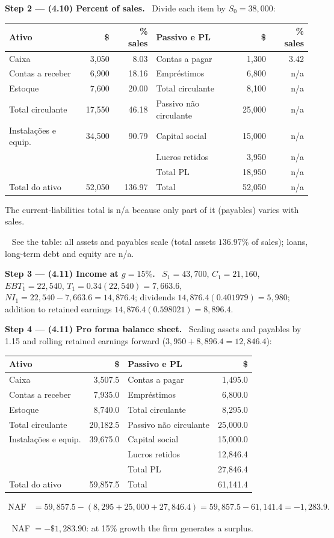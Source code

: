 \documentclass[11pt,a4paper]{article}
\newcommand{\step}[2]{\par\medskip\noindent\textbf{Step #1 --- #2.}~}
\newcommand{\answer}[1]{\par\smallskip\noindent\fbox{\textbf{Answer #1.}}~}
\begin{document}
\step{2}{(4.10) Percent of sales} Divide each item by $S_0=38{,}000$:
\begin{center}\small
\begin{tabular}{lrr@{\qquad}lrr}
\toprule
Ativo & \$ & \% sales & Passivo e PL & \$ & \% sales\\
\midrule
Caixa & 3,050 & 8.03 & Contas a pagar & 1,300 & 3.42\\
Contas a receber & 6,900 & 18.16 & Empr\'estimos & 6,800 & n/a\\
Estoque & 7,600 & 20.00 & Total circulante & 8,100 & n/a\\
Total circulante & 17,550 & 46.18 & Passivo n\~ao circulante & 25,000 & n/a\\
Instala\c{c}\~oes e equip. & 34,500 & 90.79 & Capital social & 15,000 & n/a\\
 & & & Lucros retidos & 3,950 & n/a\\
 & & & Total PL & 18,950 & n/a\\
Total do ativo & 52,050 & 136.97 & Total & 52,050 & n/a\\
\bottomrule
\end{tabular}
\end{center}
The current-liabilities total is n/a because only part of it (payables) varies with sales.
\answer{(4.10)} See the table: all assets and payables scale (total assets $136.97\%$ of sales); loans,
long-term debt and equity are n/a.

\step{3}{(4.11) Income at $g=15\%$} $S_1=43{,}700$, $C_1=21{,}160$, $EBT_1=22{,}540$,
$T_1=0.34(22{,}540)=7{,}663.6$, $NI_1=22{,}540-7{,}663.6=14{,}876.4$; dividends
$14{,}876.4(0.401979)=5{,}980$; addition to retained earnings $14{,}876.4(0.598021)=8{,}896.4$.

\step{4}{(4.11) Pro forma balance sheet} Scaling assets and payables by 1.15 and rolling retained
earnings forward ($3{,}950+8{,}896.4=12{,}846.4$):
\begin{center}\small
\begin{tabular}{lr@{\qquad}lr}
\toprule
Ativo & \$ & Passivo e PL & \$\\
\midrule
Caixa & 3,507.5 & Contas a pagar & 1,495.0\\
Contas a receber & 7,935.0 & Empr\'estimos & 6,800.0\\
Estoque & 8,740.0 & Total circulante & 8,295.0\\
Total circulante & 20,182.5 & Passivo n\~ao circulante & 25,000.0\\
Instala\c{c}\~oes e equip. & 39,675.0 & Capital social & 15,000.0\\
 & & Lucros retidos & 12,846.4\\
 & & Total PL & 27,846.4\\
Total do ativo & 59,857.5 & Total & 61,141.4\\
\bottomrule
\end{tabular}
\end{center}
\begin{align}
  \text{NAF} &= 59{,}857.5-(8{,}295+25{,}000+27{,}846.4) = 59{,}857.5-61{,}141.4 = -1{,}283.9. \label{r2ce7-naf}
\end{align}
\answer{(4.11)} NAF $=-\$1{,}283.90$: at 15\% growth the firm generates a surplus.
\end{document}
